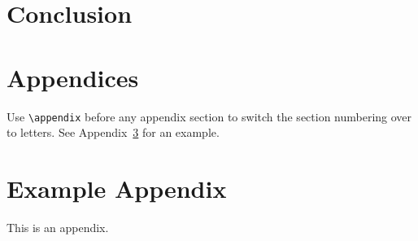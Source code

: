 \documentclass[11pt]{article}
\begin{document}
\section{Conclusion}



\section{Appendices}

Use \verb|\appendix| before any appendix section to switch the section numbering over to letters.
See Appendix~\ref{sec:appendix} for an example.

\appendix
\section{Example Appendix}
\label{sec:appendix}

This is an appendix.
\end{document}
